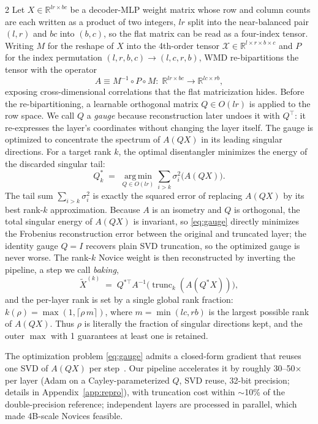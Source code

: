 \documentclass[9pt]{article}
\begin{document}
\begin{multicols}{2}
Let $X \in \mathbb{R}^{lr \times bc}$ be a decoder-MLP weight matrix whose row
and column counts are each written as a product of two integers, $lr$ split
into the near-balanced pair $(l, r)$ and $bc$ into $(b, c)$, so the flat
matrix can be read as a four-index tensor. Writing $M$ for
the reshape of $X$ into the 4th-order tensor
$\mathcal{X} \in \mathbb{R}^{l \times r \times b \times c}$ and $P$ for the
index permutation $(l,r,b,c) \to (l,c,r,b)$, WMD re-bipartitions the tensor
with the operator
\begin{equation}
A \equiv M^{-1} \circ P \circ M \colon\;
\mathbb{R}^{lr \times bc} \to \mathbb{R}^{lc \times rb},
\end{equation}
exposing cross-dimensional correlations that the flat matricization hides.
Before the re-bipartitioning, a learnable orthogonal matrix
$Q \in O(lr)$ is applied to the row space. We call
$Q$ a \emph{gauge} because reconstruction later undoes it with $Q^{\top}$:
it re-expresses the layer's coordinates without changing the layer itself.
The gauge is optimized to concentrate the spectrum of $A(QX)$ in its leading
singular directions. For a target rank $k$, the optimal
disentangler minimizes the energy of the discarded singular tail:
\begin{equation}
Q^{*}_{k} \;=\; \operatorname*{arg\,min}_{Q \in O(lr)}
\sum_{i > k} \sigma_i^2\bigl(A(QX)\bigr).
\label{eq:gauge}
\end{equation}
The tail sum $\sum_{i>k}\sigma_i^2$ is exactly the squared error of replacing
$A(QX)$ by its best rank-$k$ approximation. Because $A$ is an isometry and
$Q$ is orthogonal, the total singular energy of $A(QX)$ is invariant, so
\eqref{eq:gauge} directly minimizes the Frobenius reconstruction error between
the original and truncated layer; the identity gauge $Q{=}I$
recovers plain SVD truncation, so the optimized gauge is never worse. The
rank-$k$ Novice weight is then reconstructed by inverting the pipeline, a
step we call \emph{baking},
\begin{equation}
\widetilde{X}^{(k)} \;=\; Q^{*\top}
A^{-1}\bigl(\operatorname{trunc}_k(A(Q^{*}X))\bigr),
\label{eq:bake}
\end{equation}
and the per-layer rank is set by a single global rank fraction:
$k(\rho) = \max(1, \lceil \rho\, m \rceil)$, where $m = \min(lc, rb)$ is the
largest possible rank of $A(QX)$. Thus $\rho$ is literally the fraction of
singular directions kept, and the outer $\max$ with 1 guarantees at least one
is retained.

The optimization problem \eqref{eq:gauge} admits a closed-form gradient that
reuses one SVD of $A(QX)$ per step~\citep{wei2025tensor}. Our pipeline
accelerates it by roughly 30--50$\times$ per layer (Adam on a
Cayley-parameterized $Q$, SVD reuse, 32-bit precision; details in
Appendix~\ref{app:repro}), with truncation cost within $\sim$10\% of the
double-precision reference; independent layers are processed in parallel,
which made 4B-scale Novices feasible.


\end{multicols}
\end{document}
